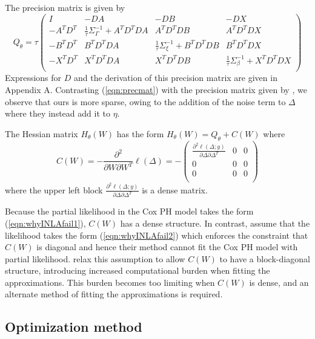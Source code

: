 \documentclass[ba]{imsart}
\begin{document}
The precision matrix is given by
\begin{equation}\label{eqn:precmat}
Q_{\theta} = \tau\begin{pmatrix}
I & -DA & -DB & - DX \\
- A^{T}D^{T} & \frac{1}{\tau}\Sigma_{\Gamma}^{-1} +  A^{T}D^{T}DA &  A^{T}D^{T}DB &  A^{T}D^{T}DX \\
- B^{T}D^{T} &  B^{T}D^{T}DA & \frac{1}{\tau}\Sigma_{\xi}^{-1} +  B^{T}D^{T}DB & B^{T}D^{T}DX \\
- X^{T}D^{T} &  X^{T}D^{T}DA & X^{T}D^{T}DB & \frac{1}{\tau}\Sigma_{\beta}^{-1} +  X^{T}D^{T}DX \\
\end{pmatrix}
\end{equation}
Expressions for $D$ and the derivation of this precision matrix are given in Appendix A. Contrasting (\ref{eqn:precmat}) with the precision matrix given by \citet{casecross}, we observe that ours is more sparse, owing to the addition of the noise term to $\Delta$ where they instead add it to $\eta$.

The Hessian matrix $H_{\theta}(W)$ has the form $H_{\theta}(W) = Q_{\theta} + C(W)$ where
\begin{equation*}
C(W) = -\frac{\partial^{2}}{\partial W\partial W^{T}}\ell(\Delta) = -\begin{pmatrix}
\frac{\partial^{2}\ell(\Delta;y)}{\partial\Delta\partial\Delta^{T}} & 0 & 0 \\
0 & 0 & 0 \\
0 & 0 & 0 \\
\end{pmatrix}
\end{equation*}
where the upper left block $\frac{\partial^{2}\ell(\Delta;y)}{\partial\Delta\partial\Delta^{T}}$ is a dense matrix.

Because the partial likelihood in the Cox PH model takes the form (\ref{eqn:whyINLAfail1}), $C(W)$ has a dense structure. In contrast, \cite{inla} assume that the likelihood takes the form (\ref{eqn:whyINLAfail2}) which enforces the constraint that $C(W)$ is diagonal and hence their method cannot fit the Cox PH model with partial likelihood. \cite{casecross} relax this assumption to allow $C(W)$ to have a block-diagonal structure, introducing increased computational burden when fitting the approximations. This burden becomes too limiting when $C(W)$ is dense, and an alternate method of fitting the approximations is required.

\subsection{Optimization method}\label{subsec:opt}
\end{document}
